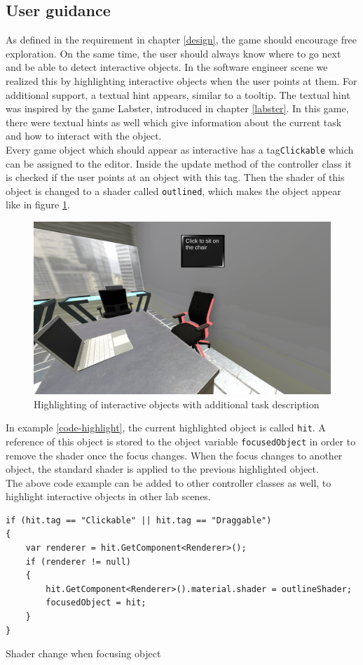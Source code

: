 \newpage
\subsection{User guidance}
As defined in the requirement in chapter \ref{design}, the game should encourage free exploration. On the same time, the user should always know where to go next and be able to detect interactive objects. In the software engineer scene we realized this by highlighting interactive objects when the user points at them. For additional support, a textual hint appears, similar to a tooltip. The textual hint was inspired by the game Labster, introduced in chapter \ref{labster}. In this game, there were textual hints as well which give information about the current task and how to interact with the object.\\
Every game object which should appear as interactive has a tag\texttt{Clickable} which can be assigned to the editor. Inside the update method of the controller class it is checked if the user points at an object with this tag. Then the shader of this object is changed to a shader called \texttt{outlined}, which makes the object appear like in figure \ref{fig:user-hints}.
\begin{figure}[h!]
  \includegraphics[width=13cm]{kapitel/user-hint-screenshot.PNG}
  \centering
  \caption{Highlighting of interactive objects with additional task description}
  \label{fig:user-hints}
\end{figure}

In example \ref{code-highlight}, the current highlighted object is called \texttt{hit}. A reference of this object is stored to the object variable \texttt{focusedObject} in order to remove the shader once the focus changes.
When the focus changes to another object, the standard shader is applied to the previous highlighted object.\\
The above code example can be added to other controller classes as well, to highlight interactive objects in other lab scenes.
\newpage
\begin{lstlisting} 
if (hit.tag == "Clickable" || hit.tag == "Draggable")
{
    var renderer = hit.GetComponent<Renderer>();
    if (renderer != null)
    {
        hit.GetComponent<Renderer>().material.shader = outlineShader;
        focusedObject = hit;
    }
}
\end{lstlisting} 
\caption{Shader change when focusing object}
\label{code-highlight}
\vspace{1cm}

